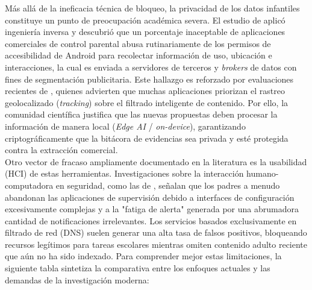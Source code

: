Más allá de la ineficacia técnica de bloqueo, la privacidad de los datos infantiles constituye un punto de preocupación académica severa. El estudio de \cite{feal_angel_2020} aplicó ingeniería inversa y descubrió que un porcentaje inaceptable de aplicaciones comerciales de control parental abusa rutinariamente de los permisos de accesibilidad de Android para recolectar información de uso, ubicación e interacciones, la cual es enviada a servidores de terceros y \textit{brokers} de datos con fines de segmentación publicitaria. Este hallazgo es reforzado por evaluaciones recientes de \cite{alqahtani_childrens_2023}, quienes advierten que muchas aplicaciones priorizan el rastreo geolocalizado (\textit{tracking}) sobre el filtrado inteligente de contenido. Por ello, la comunidad científica justifica que las nuevas propuestas deben procesar la información de manera local (\textit{Edge AI} / \textit{on-device}), garantizando criptográficamente que la bitácora de evidencias sea privada y esté protegida contra la extracción comercial.\\

Otro vector de fracaso ampliamente documentado en la literatura es la usabilidad (HCI) de estas herramientas. Investigaciones sobre la interacción humano-computadora en seguridad, como las de \cite{gnanasekaran_usability_2023}, señalan que los padres a menudo abandonan las aplicaciones de supervisión debido a interfaces de configuración excesivamente complejas y a la "fatiga de alerta" generada por una abrumadora cantidad de notificaciones irrelevantes. Los servicios basados exclusivamente en filtrado de red (DNS) suelen generar una alta tasa de falsos positivos, bloqueando recursos legítimos para tareas escolares mientras omiten contenido adulto reciente que aún no ha sido indexado. Para comprender mejor estas limitaciones, la siguiente tabla sintetiza la comparativa entre los enfoques actuales y las demandas de la investigación moderna:

